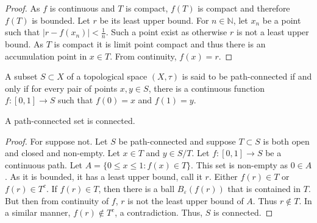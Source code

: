             \begin{proof}
            As $f$ is continuous and $T$ is compact, $f(T)$ is compact and therefore $f(T)$ is bounded. Let $r$ be its least upper bound. For $n\in \mathbb{N}$, let $x_n$ be a point such that $|r-f(x_n)|< \frac{1}{n}$. Such a point exist as otherwise $r$ is not a least upper bound. As $T$ is compact it is limit point compact and thus there is an accumulation point in $x\in T$. From continuity, $f(x) = r$.
            \end{proof}
            \begin{definition}
            A subset $S\subset X$ of a topological space $(X,\tau)$ is said to be path-connected if and only if for every pair of points $x,y\in S$, there is a continuous function $f:[0,1]\rightarrow S$ such that $f(0)=x$ and $f(1)=y$.
            \end{definition}
            \begin{theorem}
            A path-connected set is connected.
            \end{theorem}
            \begin{proof}
            For suppose not. Let $S$ be path-connected and suppose $T\subset S$ is both open and closed and non-empty. Let $x\in T$ and $y\in S/T$. Let $f:[0,1]\rightarrow S$ be a continuous path. Let $A =\{0\leq x \leq 1: f(x) \in T\}$. This set is non-empty as $0\in A$. As it is bounded, it has a least upper bound, call it $r$. Either $f(r)\in T$ or $f(r)\in T^c$. If $f(r)\in T$, then there is a ball $B_{\varepsilon}(f(r))$ that is contained in $T$. But then from continuity of $f$, $r$ is not the least upper bound of $A$. Thus $r\notin T$. In a similar manner, $f(r)\notin T^c$, a contradiction. Thus, $S$ is connected.
            \end{proof}
